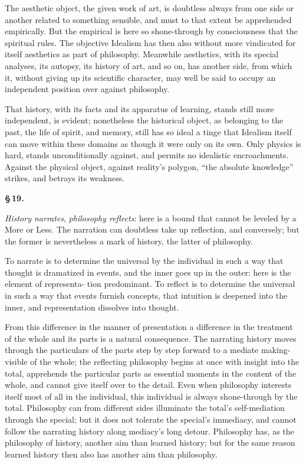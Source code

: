 \documentclass[12pt]{book}
\begin{document}
The aesthetic object, the given work of art, is doubtless always from one side or another related to
something sensible, and must to that extent be apprehended empirically. But the empirical is here so
shone-through by consciousness that the spiritual rules. The objective Idealism has then also without
more vindicated for itself aesthetics as part of philosophy. Meanwhile aesthetics, with its special
analyses, its autopsy, its history of art, and so on, has another side, from which it, without giving
up its scientific character, may well be said to occupy an independent position over against philosophy.

That history, with its facts and its apparatus of learning, stands still more independent, is evident;
nonetheless the historical object, as belonging to the past, the life of spirit, and memory, still has
so ideal a tinge that Idealism itself can move within these domains as though it were only on its own.
Only physics is hard, stands unconditionally against, and permits no idealistic encroachments. Against
the physical object, against reality's polygon, ``the absolute knowledge'' strikes, and betrays its
weakness.

\begin{center}{\bfseries \S\,19.}\end{center}

\emph{History narrates}, \emph{philosophy reflects}: here is a bound that cannot be leveled by a More
or Less. The narration can doubtless take up reflection, and conversely; but the former is nevertheless
a mark of history, the latter of philosophy.

To narrate is to determine the universal by the individual in such a way that thought is dramatized in
events, and the inner goes up in the outer: here is the element of representa-
tion predominant. To reflect is to determine the universal in such a way that events furnish concepts,
that intuition is deepened into the inner, and representation dissolves into thought.

From this difference in the manner of presentation a difference in the treatment of the whole and its
parts is a natural consequence. The narrating history moves through the particulars of the parts step by
step forward to a mediate making-visible of the whole; the reflecting philosophy begins at once with
insight into the total, apprehends the particular parts as essential moments in the content of the whole,
and cannot give itself over to the detail. Even when philosophy interests itself most of all in the
individual, this individual is always shone-through by the total. Philosophy can from different sides
illuminate the total's self-mediation through the special; but it does not tolerate the special's
immediacy, and cannot follow the narrating history along mediacy's long detour. Philosophy has, as the
philosophy of history, another aim than learned history; but for the same reason learned history then also
has another aim than philosophy.
\end{document}
